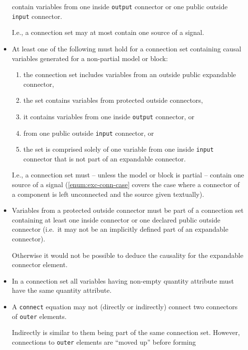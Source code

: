 \begin{itemize}
  contain variables from one inside \lstinline!output! connector or one public
  outside \lstinline!input! connector.
  \begin{nonnormative}
  I.e., a connection set may at most contain one source of a signal.
  \end{nonnormative}
\item
  At least one of the following must hold for a connection set
  containing causal variables generated for a non-partial model or
  block:
\begin{enumerate}
\item the connection set includes variables from an outside public
  expandable connector,
\item the set contains variables from protected
  outside connectors,
\item it contains variables from one inside \lstinline!output!
  connector, or
\item from one public outside \lstinline!input! connector, or
\item the  set is comprised solely of one variable from one inside \lstinline!input!
  connector that is not part of an expandable connector. \label{enum:exc-conn-case}
\end{enumerate}
\begin{nonnormative}
I.e., a connection set must -- unless the model or block is partial -- contain one source of a signal (\cref{enum:exc-conn-case}
covers the case where a connector of a component is left unconnected and the source given textually).
\end{nonnormative}
\item
  Variables from a protected outside connector must be part of a
  connection set containing at least one inside connector or one
  declared public outside connector (i.e.\ it may not be an implicitly
  defined part of an expandable connector).
  \begin{nonnormative}
  Otherwise it would not be possible to deduce the causality for the expandable connector element.
  \end{nonnormative}
\item
  In a connection set all variables having non-empty quantity attribute
  must have the same quantity attribute.
\item
  A \lstinline!connect! equation may not (directly or indirectly) connect two
  connectors of \lstinline!outer! elements.
  \begin{nonnormative}
  Indirectly is similar to them being part of the same connection set.  However, connections to \lstinline!outer! elements are ``moved up'' before forming

\end{nonnormative}
\end{itemize}
